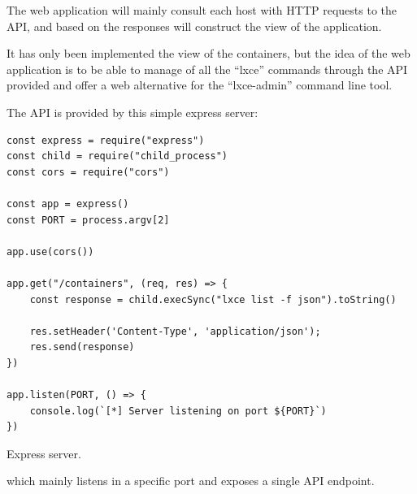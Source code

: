 The web application will mainly consult each host with HTTP requests to the API, and based on the responses will construct the view of the application. 

It has only been implemented the view of the containers, but the idea of the web application is to be able to manage of all the ``lxce'' commands through the API provided and offer a web alternative for the ``lxce-admin'' command line tool.

\newpage
The API is provided by this simple express server:
\begin{listing}[H]
\begin{verbatim}
const express = require("express")
const child = require("child_process")
const cors = require("cors")

const app = express()
const PORT = process.argv[2]

app.use(cors())

app.get("/containers", (req, res) => {
    const response = child.execSync("lxce list -f json").toString()

    res.setHeader('Content-Type', 'application/json');
    res.send(response)
})

app.listen(PORT, () => {
    console.log(`[*] Server listening on port ${PORT}`)
})
\end{verbatim}
\caption{Express server.}
\label{listings: lxce alias}
\end{listing}

which mainly listens in a specific port and exposes a single API endpoint.

